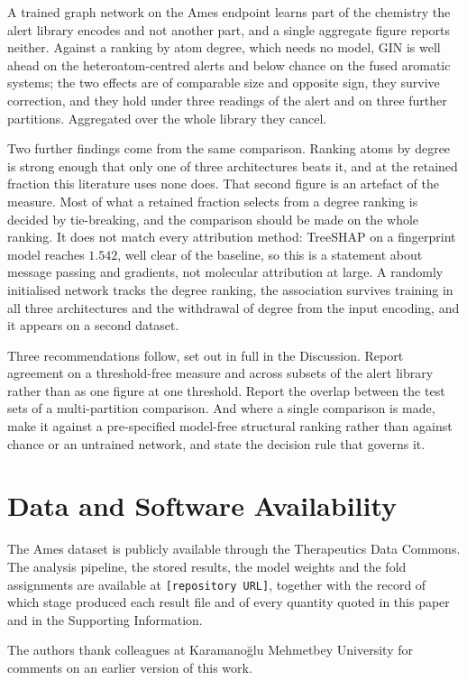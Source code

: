 \documentclass[journal=jcisd8,manuscript=article]{achemso}
\begin{document}
A trained graph network on the Ames endpoint learns part of the chemistry the alert library
encodes and not another part, and a single aggregate figure reports neither. Against a ranking
by atom degree, which needs no model, GIN is well ahead on the heteroatom-centred alerts and
below chance on the fused aromatic systems; the two effects are of comparable size and
opposite sign, they survive correction, and they hold under three readings of the alert and on
three further partitions. Aggregated over the whole library they cancel.

Two further findings come from the same comparison. Ranking atoms by degree is strong enough
that only one of three architectures beats it, and at the retained fraction this literature
uses none does. That second figure is an artefact of the measure. Most of what a retained fraction selects
from a degree ranking is decided by tie-breaking, and the comparison should be made on the
whole ranking. It does not match every attribution method: TreeSHAP on a
fingerprint model reaches $1.542$, well clear of the baseline, so this is a statement about
message passing and gradients, not molecular attribution at large. A randomly initialised network tracks the degree ranking, the association survives
training in all three architectures and the withdrawal of degree from the input encoding, and
it appears on a second dataset.

Three recommendations follow, set out in full in the Discussion. Report agreement on a
threshold-free measure and across subsets of the alert library rather than as one figure at
one threshold. Report the overlap between the test sets of a multi-partition comparison. And
where a single comparison is made, make it against a pre-specified model-free structural
ranking rather than against chance or an untrained network, and state the decision rule that
governs it.

\section*{Data and Software Availability}

The Ames dataset is publicly available through the Therapeutics Data Commons. The analysis
pipeline, the stored results, the model weights and the fold assignments are available at
\texttt{[repository URL]}, together with the record of which stage produced each result file
and of every quantity quoted in this paper and in the Supporting Information.

\begin{acknowledgement}
The authors thank colleagues at Karamanoğlu Mehmetbey University for comments on an earlier
version of this work.
\end{acknowledgement}
\end{document}
